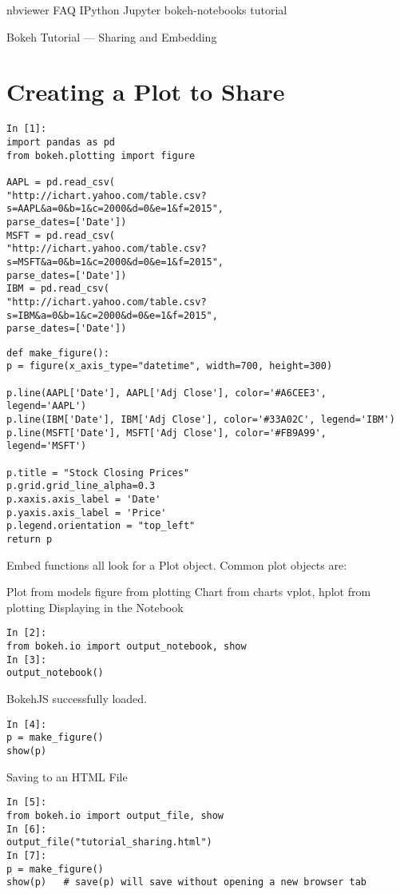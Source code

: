 nbviewer
FAQ
IPython
Jupyter
bokeh-notebooks   tutorial
 	
Bokeh Tutorial — Sharing and Embedding
\section{Creating a Plot to Share}
\begin{verbatim}
In [1]:
import pandas as pd
from bokeh.plotting import figure

AAPL = pd.read_csv(
"http://ichart.yahoo.com/table.csv?s=AAPL&a=0&b=1&c=2000&d=0&e=1&f=2015",
parse_dates=['Date'])
MSFT = pd.read_csv(
"http://ichart.yahoo.com/table.csv?s=MSFT&a=0&b=1&c=2000&d=0&e=1&f=2015",
parse_dates=['Date'])
IBM = pd.read_csv(
"http://ichart.yahoo.com/table.csv?s=IBM&a=0&b=1&c=2000&d=0&e=1&f=2015",
parse_dates=['Date'])
\end{verbatim}

\begin{verbatim}
def make_figure():
p = figure(x_axis_type="datetime", width=700, height=300)

p.line(AAPL['Date'], AAPL['Adj Close'], color='#A6CEE3', legend='AAPL')
p.line(IBM['Date'], IBM['Adj Close'], color='#33A02C', legend='IBM')
p.line(MSFT['Date'], MSFT['Adj Close'], color='#FB9A99', legend='MSFT')

p.title = "Stock Closing Prices"
p.grid.grid_line_alpha=0.3
p.xaxis.axis_label = 'Date'
p.yaxis.axis_label = 'Price'
p.legend.orientation = "top_left"
return p
\end{verbatim}

Embed functions all look for a Plot object. Common plot objects are:

Plot from models
figure from plotting
Chart from charts
vplot, hplot from plotting
Displaying in the Notebook

\begin{verbatim}
In [2]:
from bokeh.io import output_notebook, show
In [3]:
output_notebook()
\end{verbatim}
BokehJS successfully loaded.
\begin{verbatim}
In [4]:
p = make_figure()
show(p)
\end{verbatim}
Saving to an HTML File
\begin{verbatim}
In [5]:
from bokeh.io import output_file, show
In [6]:
output_file("tutorial_sharing.html")
In [7]:
p = make_figure()
show(p)   # save(p) will save without opening a new browser tab
\end{verbatim}

